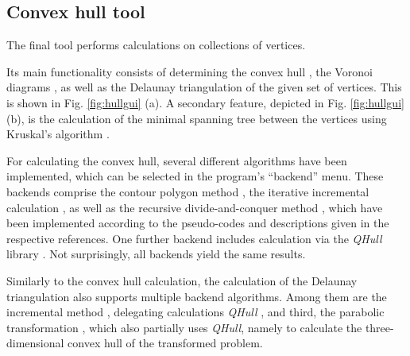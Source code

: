 \subsection{Convex hull tool}
\label{sec:tests_hull}
The final tool performs calculations on collections of vertices.

Its main functionality consists of determining the convex hull \cite[Ch. 11, pp. 243-258]{Berg2008}, 
the Voronoi diagrams \cite[Ch. 7, pp. 147-171]{Berg2008}, 
as well as the Delaunay triangulation \cite[Ch. 9, pp. 191-218]{Berg2008} 
of the given set of vertices. This is shown in Fig. \ref{fig:hullgui} (a).
A secondary feature, depicted in Fig. \ref{fig:hullgui} (b), is the calculation of 
the minimal spanning tree between the vertices using Kruskal's algorithm \cite[pp. 265-268]{Erickson2019}.

For calculating the convex hull, several different algorithms have been implemented,
which can be selected in the program's ``backend'' menu.
These backends comprise the contour polygon method \cite[Ch. 3.1.5, pp. 125-128]{FUH_geo2020},
the iterative incremental calculation \cite[Ch. 3.1.3, pp. 117-123]{FUH_geo2020}, as well as the 
recursive divide-and-conquer method \cite[Ch. 3.1.4, pp. 123-125]{FUH_geo2020}, 
which have been implemented according to the pseudo-codes and descriptions given
in the respective references.
One further backend includes calculation via the \textit{QHull} library \cite{web_qhull}.
Not surprisingly, all backends yield the same results.

Similarly to the convex hull calculation, the calculation of the Delaunay triangulation
also supports multiple backend algorithms.
Among them are the incremental method \cite[Ch. 6.2, pp. 269-282]{FUH_geo2020}, 
delegating calculations \textit{QHull} \cite{web_qhull}, 
and third, the parabolic transformation \cite[Ch. 6.5, pp. 298-300]{FUH_geo2020}, 
which also partially uses \textit{QHull}, namely to calculate the three-dimensional 
convex hull of the transformed problem.

